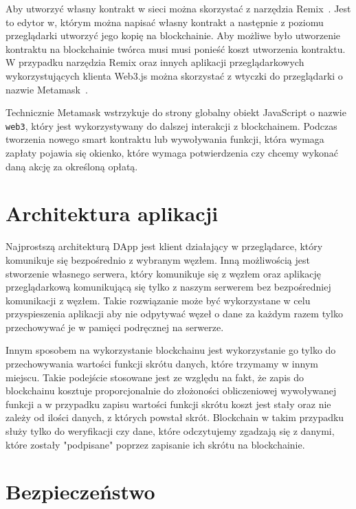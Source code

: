 \documentclass[]{llncs}
\renewcommand{\footnote}[1]{~\oldfootnote{#1}}
\newcommand{\code}[1]{\texttt{#1}}
\begin{document}
  Aby utworzyć własny kontrakt w sieci można skorzystać z narzędzia
  Remix\footnote{\url{https://remix.ethereum.org/}}. Jest to edytor w, którym można
  napisać własny kontrakt a następnie z poziomu przeglądarki utworzyć jego kopię
  na blockchainie. Aby możliwe było utworzenie kontraktu na blockchainie twórca
  musi musi ponieść koszt utworzenia kontraktu. W przypadku narzędzia Remix oraz
  innych aplikacji przeglądarkowych wykorzystujących klienta Web3.js można
  skorzystać z wtyczki do przeglądarki o nazwie
  Metamask\footnote{\url{https://metamask.io/}}.

  Technicznie Metamask wstrzykuje do strony globalny obiekt JavaScript o nazwie
  \code{web3}, który jest wykorzystywany do dalszej interakcji z blockchainem. Podczas
  tworzenia nowego smart kontraktu lub wywoływania funkcji, która wymaga zapłaty
  pojawia się okienko, które wymaga potwierdzenia czy chcemy wykonać daną akcję
  za określoną opłatą.

\section{Architektura aplikacji}

  Najprostszą architekturą DApp jest klient działający w przeglądarce, który
  komunikuje się bezpośrednio z wybranym węzłem. Inną możliwością jest
  stworzenie własnego serwera, który komunikuje się z węzłem oraz aplikację
  przeglądarkową komunikującą się tylko z naszym serwerem bez bezpośredniej
  komunikacji z węzłem. Takie rozwiązanie może być wykorzystane w celu
  przyspieszenia aplikacji aby nie odpytywać węzeł o dane za każdym razem tylko
  przechowywać je w pamięci podręcznej na serwerze.

  Innym sposobem na wykorzystanie blockchainu jest wykorzystanie go tylko do
  przechowywania wartości funkcji skrótu danych, które trzymamy w innym miejscu.
  Takie podejście stosowane jest ze względu na fakt, że zapis do blockchainu
  kosztuje proporcjonalnie do złożoności obliczeniowej wywoływanej funkcji a w
  przypadku zapisu wartości funkcji skrótu koszt jest stały oraz nie zależy od
  ilości danych, z których powstał skrót. Blockchain w takim przypadku służy
  tylko do weryfikacji czy dane, które odczytujemy zgadzają się z danymi, które
  zostały "podpisane" poprzez zapisanie ich skrótu na blockchainie.

\section{Bezpieczeństwo}
\end{document}
